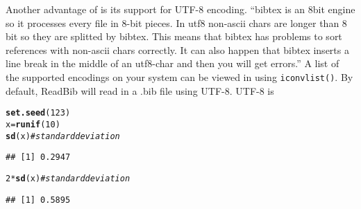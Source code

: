 \documentclass[article]{jss}\usepackage[]{graphicx}\usepackage[]{color}
\makeatletter
\newcommand{\hlnum}[1]{\textcolor[rgb]{0.686,0.059,0.569}{#1}}%
\newcommand{\hlcom}[1]{\textcolor[rgb]{0.678,0.584,0.686}{\textit{#1}}}%
\newcommand{\hlopt}[1]{\textcolor[rgb]{0,0,0}{#1}}%
\newcommand{\hlstd}[1]{\textcolor[rgb]{0.345,0.345,0.345}{#1}}%
\newcommand{\hlkwb}[1]{\textcolor[rgb]{0.69,0.353,0.396}{#1}}%
\newcommand{\hlkwd}[1]{\textcolor[rgb]{0.737,0.353,0.396}{\textbf{#1}}}%
\newenvironment{kframe}{%
 \def\at@end@of@kframe{}%
 \ifinner\ifhmode%
  \def\at@end@of@kframe{\end{minipage}}%
  \begin{minipage}{\columnwidth}%
 \fi\fi%
 \def\FrameCommand##1{\hskip\@totalleftmargin \hskip-\fboxsep
 \colorbox{shadecolor}{##1}\hskip-\fboxsep
     \hskip-\linewidth \hskip-\@totalleftmargin \hskip\columnwidth}%
 \MakeFramed {\advance\hsize-\width
   \@totalleftmargin\z@ \linewidth\hsize
   \@setminipage}}%
 {\par\unskip\endMakeFramed%
 \at@end@of@kframe}
\newenvironment{knitrout}{}{} %
\makeatother
\begin{document}
Another advantage of \Biblatex{} is its support for UTF-8 encoding. ``bibtex is an 8bit engine so it processes every file in 8-bit pieces. In utf8 non-ascii chars are longer than 8 bit so they are splitted by bibtex. This means that bibtex has problems to sort references with non-ascii chars correctly. It can also happen that bibtex inserts a line break in the middle of an utf8-char and then you will get errors.''  A list of the supported encodings on your system can be viewed in \R using \texttt{iconvlist()}.  By default, ReadBib will read in a .bib file using UTF-8.  UTF-8 is  

\begin{knitrout}
\color{fgcolor}\begin{kframe}
\begin{alltt}
\hlkwd{set.seed}\hlstd{(}\hlnum{123}\hlstd{)}
\hlstd{x} \hlkwb{=} \hlkwd{runif}\hlstd{(}\hlnum{10}\hlstd{)}
\hlkwd{sd}\hlstd{(x)}  \hlcom{# standard deviation}
\end{alltt}
\begin{verbatim}
## [1] 0.2947
\end{verbatim}
\end{kframe}
\end{knitrout}


\begin{knitrout}
\color{fgcolor}\begin{kframe}
\begin{alltt}
\hlnum{2} \hlopt{*} \hlkwd{sd}\hlstd{(x)}  \hlcom{# standard deviation}
\end{alltt}
\begin{verbatim}
## [1] 0.5895
\end{verbatim}
\end{kframe}
\end{knitrout}



\end{document}
